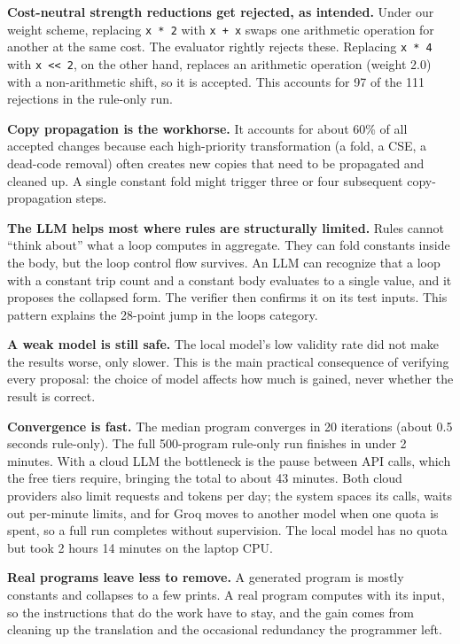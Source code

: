 \documentclass[12pt,a4paper]{report}
\begin{document}
\textbf{Cost-neutral strength reductions get rejected, as intended.} Under our weight scheme, replacing \texttt{x * 2} with \texttt{x + x} swaps one arithmetic operation for another at the same cost. The evaluator rightly rejects these. Replacing \texttt{x * 4} with \texttt{x {<}{<} 2}, on the other hand, replaces an arithmetic operation (weight 2.0) with a non-arithmetic shift, so it is accepted. This accounts for 97 of the 111 rejections in the rule-only run.

\textbf{Copy propagation is the workhorse.} It accounts for about 60\% of all accepted changes because each high-priority transformation (a fold, a CSE, a dead-code removal) often creates new copies that need to be propagated and cleaned up. A single constant fold might trigger three or four subsequent copy-propagation steps.

\textbf{The LLM helps most where rules are structurally limited.} Rules cannot ``think about'' what a loop computes in aggregate. They can fold constants inside the body, but the loop control flow survives. An LLM can recognize that a loop with a constant trip count and a constant body evaluates to a single value, and it proposes the collapsed form. The verifier then confirms it on its test inputs. This pattern explains the 28-point jump in the loops category.

\textbf{A weak model is still safe.} The local model's low validity rate did not make the results worse, only slower. This is the main practical consequence of verifying every proposal: the choice of model affects how much is gained, never whether the result is correct.

\textbf{Convergence is fast.} The median program converges in 20 iterations (about 0.5 seconds rule-only). The full 500-program rule-only run finishes in under 2 minutes. With a cloud LLM the bottleneck is the pause between API calls, which the free tiers require, bringing the total to about 43 minutes. Both cloud providers also limit requests and tokens per day; the system spaces its calls, waits out per-minute limits, and for Groq moves to another model when one quota is spent, so a full run completes without supervision. The local model has no quota but took 2 hours 14 minutes on the laptop CPU.

\textbf{Real programs leave less to remove.} A generated program is mostly constants and collapses to a few prints. A real program computes with its input, so the instructions that do the work have to stay, and the gain comes from cleaning up the translation and the occasional redundancy the programmer left.
\end{document}
